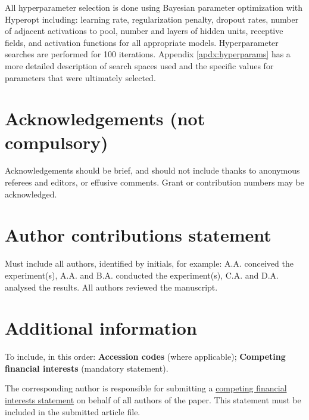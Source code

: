 \documentclass[fleqn,10pt]{wlscirep}
\begin{document}
All hyperparameter selection is done using Bayesian parameter optimization with Hyperopt \cite{Bergstra2013} including: learning rate, regularization penalty, dropout rates, number of adjacent activations to pool, number and layers of hidden units, receptive fields, and activation functions for all appropriate models. Hyperparameter searches are performed for 100 iterations. Appendix \ref{apdx:hyperparams} has a more detailed description of search spaces used and the specific values for parameters that were ultimately selected.



\section*{Acknowledgements (not compulsory)}

Acknowledgements should be brief, and should not include thanks to anonymous referees and editors, or effusive comments. Grant or contribution numbers may be acknowledged.

\section*{Author contributions statement}

Must include all authors, identified by initials, for example:
A.A. conceived the experiment(s),  A.A. and B.A. conducted the experiment(s), C.A. and D.A. analysed the results.  All authors reviewed the manuscript. 

\section*{Additional information}

To include, in this order: \textbf{Accession codes} (where applicable); \textbf{Competing financial interests} (mandatory statement). 

The corresponding author is responsible for submitting a \href{http://www.nature.com/srep/policies/index.html#competing}{competing financial interests statement} on behalf of all authors of the paper. This statement must be included in the submitted article file.
\end{document}
